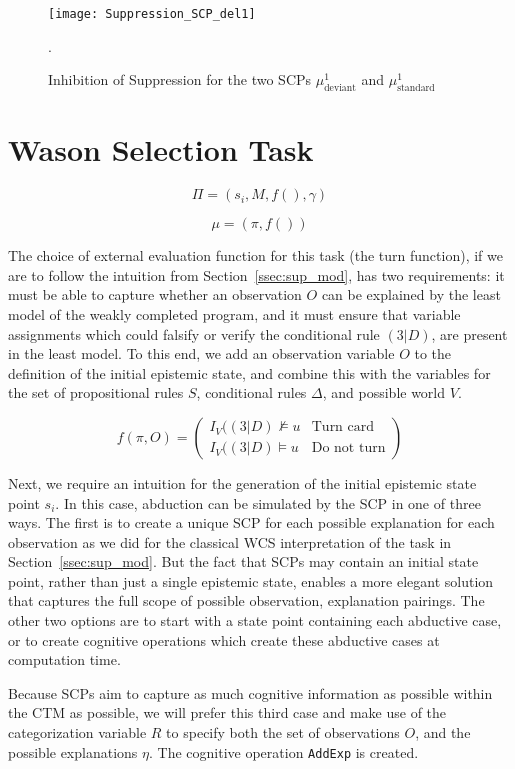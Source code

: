 \begin{figure}
\centering \texttt{[image: Suppression\_SCP\_del1]}
\caption{Inhibition of Suppression for the two SCPs $\mu^1_\text{deviant}$ and $\mu^1_\text{standard}$}.
\label{fig:Suppression_SCP_del1}
\end{figure}


\section{Wason Selection Task}\label{sec:wstSCP}

\[\Pi=(s_i,M,f(),\gamma)\]



\[\mu=(\pi,f())\]

The choice of external evaluation function for this task (the turn function), if we are to follow the intuition from Section~\ref{ssec:sup_mod}, has two requirements: it must be able to capture whether an observation $O$ can be explained by the least model of the weakly completed program, and it must ensure that variable assignments which could falsify or verify the conditional rule $(3|D)$, are present in the least model. To this end, we add an observation variable $O$ to the definition of the initial epistemic state, and combine this with the variables for the set of propositional rules $S$, conditional rules $\Delta$, and possible world $V$.

\[
f(\pi,O) = \begin{pmatrix} I_V((3|D)\not\models u  & \textrm{Turn card} \\ 
   I_V((3|D)\models u & \textrm{Do not turn} \end{pmatrix}
\]


Next, we require an intuition for the generation of the initial epistemic state point $s_i$. In this case, abduction can be simulated by the SCP in one of three ways. The first is to create a unique SCP for each possible explanation for each observation as we did for the classical WCS interpretation of the task in Section~\ref{ssec:sup_mod}. But the fact that SCPs may contain an initial state point, rather than just a single epistemic state, enables a more elegant solution that captures the full scope of possible observation, explanation pairings. The other two options are to start with a state point containing each abductive case, or to create cognitive operations which create these abductive cases at computation time.

Because SCPs aim to capture as much cognitive information as possible within the CTM as possible, we will prefer this third case and make use of the categorization variable $R$ to specify both the set of observations $O$, and the possible explanations $\eta$. The cognitive operation \texttt{AddExp} is created.

